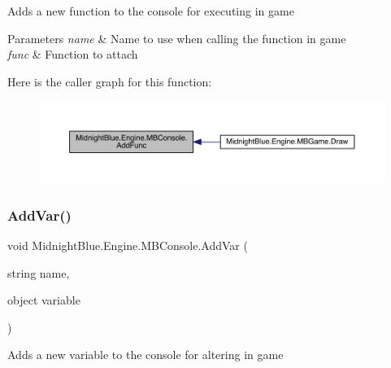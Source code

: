 Adds a new function to the console for executing in game 


\begin{DoxyParams}{Parameters}
{\em name} & Name to use when calling the function in game\\
\hline
{\em func} & Function to attach\\
\hline
\end{DoxyParams}
Here is the caller graph for this function\+:
\nopagebreak
\begin{figure}[H]
\begin{center}
\leavevmode
\includegraphics[width=350pt]{class_midnight_blue_1_1_engine_1_1_m_b_console_a5438a91f83cf6082a20e8d2c417e6ce1_icgraph}
\end{center}
\end{figure}
\hypertarget{class_midnight_blue_1_1_engine_1_1_m_b_console_a7533b96118e74197ac3f3085e026a591}{}\label{class_midnight_blue_1_1_engine_1_1_m_b_console_a7533b96118e74197ac3f3085e026a591} 
\subsubsection{\texorpdfstring{Add\+Var()}{AddVar()}}
{\footnotesize\ttfamily void Midnight\+Blue.\+Engine.\+M\+B\+Console.\+Add\+Var (\begin{DoxyParamCaption}\item[{string}]{name,  }\item[{object}]{variable }\end{DoxyParamCaption})\hspace{0.3cm}{\ttfamily [inline]}}



Adds a new variable to the console for altering in game 


